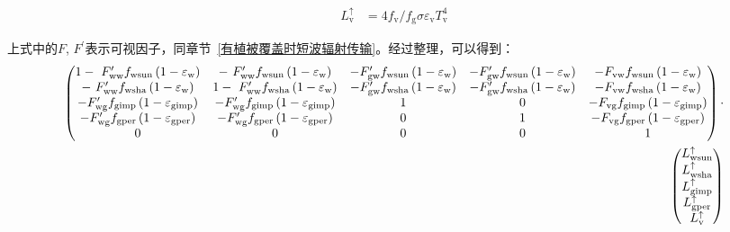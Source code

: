 \begin{landscape}
\begin{equation}
\begin{aligned}
      L_{\mathrm{v}}^{\uparrow} &=4 f_{\mathrm{v}} / f_{\mathrm{g}} \sigma \varepsilon_{\mathrm{v}} T_{\mathrm{v}}^{4}
    \end{aligned}
  \end{equation}
\end{landscape}

\begin{landscape}
  上式中的$F$, $F^\prime$表示可视因子，同章节~\ref{有植被覆盖时短波辐射传输}。经过整理，可以得到：
  \begin{equation}
    \begin{split}
      \left(\begin{matrix}1-\ F_{\mathrm{ww}}^\prime f_{\mathrm{wsun}}\left(1-\varepsilon_{\rm w}\right)&-\ F_{\mathrm{ww}}^\prime f_{\mathrm{wsun}}\left(1-\varepsilon_{\rm w}\right)&-F_{\mathrm{gw}}^\prime f_{\mathrm{wsun}}\left(1-\varepsilon_{\rm w}\right)&-F_{\mathrm{gw}}^\prime f_{\mathrm{wsun}}\left(1-\varepsilon_{\rm w}\right)&-F_{\mathrm{vw}}f_{\mathrm{wsun}}\left(1-\varepsilon_{\rm w}\right)\\
          -\ F_{\mathrm{ww}}^\prime f_{\mathrm{wsha}}\left(1-\varepsilon_{\rm w}\right)&1-\ F_{\mathrm{ww}}^\prime f_{\mathrm{wsha}}\left(1-\varepsilon_{\rm w}\right)&-F_{\mathrm{gw}}^\prime f_{\mathrm{wsha}}\left(1-\varepsilon_{\rm w}\right)&-F_{\mathrm{gw}}^\prime f_{\mathrm{wsha}}\left(1-\varepsilon_{\rm w}\right)&-F_{\mathrm{vw}}f_{\mathrm{wsha}}\left(1-\varepsilon_{\rm w}\right)\\
          -F_{\mathrm{wg}}^\prime f_{\mathrm{gimp}}\left(1-\varepsilon_{\mathrm{gimp}}\right)&-F_{\mathrm{wg}}^\prime f_{\mathrm{gimp}}\left(1-\varepsilon_{\mathrm{gimp}}\right)&1&0&-F_{\mathrm{vg}}f_{\mathrm{gimp}}\left(1-\varepsilon_{\mathrm{gimp}}\right)\\
          -F_{\mathrm{wg}}^\prime f_{\mathrm{gper}}\left(1-\varepsilon_{\mathrm{gper}}\right)&-F_{\mathrm{wg}}^\prime f_{\mathrm{gper}}\left(1-\varepsilon_{\mathrm{gper}}\right)&0&1&-F_{\mathrm{vg}}f_{\mathrm{gper}}\left(1-\varepsilon_{\mathrm{gper}}\right)\\
      0&0&0&0&1\\\end{matrix}\right)\cdot \\
      \left(\begin{matrix}L_{\mathrm{wsun}}^\uparrow\\L_{\mathrm{wsha}}^\uparrow\\L_{\mathrm{gimp}}^\uparrow\\L_{\mathrm{gper}}^\uparrow\\L_{\rm v}^\uparrow\\\end{matrix}\right)

\end{split}
\end{equation}
\end{landscape}
